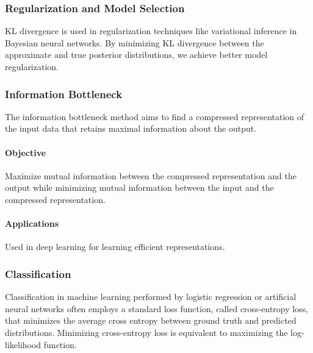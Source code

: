 \documentclass[12pt,sans]{article}
\theoremstyle{definition}
\theoremstyle{plain}
\theoremstyle{remark}
\begin{document}
\subsubsection{Regularization and Model Selection}

KL divergence is used in regularization techniques like variational inference in Bayesian neural networks. By minimizing KL divergence between the approximate and true posterior distributions, we achieve better model regularization.

\subsubsection{Information Bottleneck}

The information bottleneck method aims to find a compressed representation of the input data that retains maximal information about the output.

\paragraph{Objective} Maximize mutual information between the compressed representation and the output while minimizing mutual information between the input and the compressed representation.

\paragraph{Applications} Used in deep learning for learning efficient representations.

\subsubsection{Classification}
Classification in machine learning performed by logistic regression or artificial neural networks often employs a standard loss function, called cross-entropy loss, that minimizes the average cross entropy between ground truth and predicted distributions.
Minimizing cross-entropy loss is equivalent to maximizing the log-likelihood function.
\end{document}
